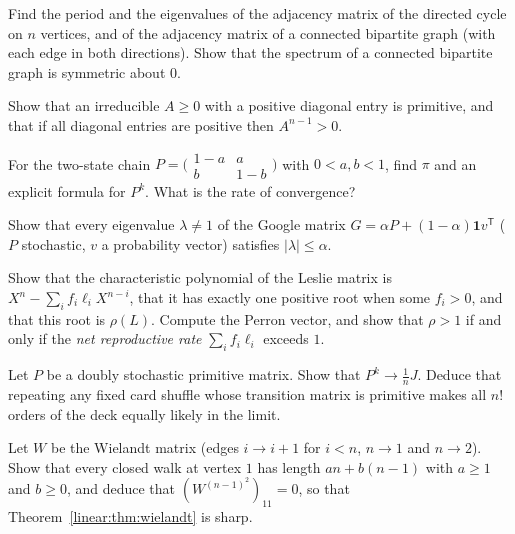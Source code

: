 \begin{exercise}[$\star$]\label{linear:ex:cycleperiod}
Find the period and the eigenvalues of the adjacency matrix of the directed cycle on $n$ vertices, and of the adjacency matrix
of a connected bipartite graph (with each edge in both directions). Show that the spectrum of a connected bipartite graph is
symmetric about $0$.
\end{exercise}

\begin{exercise}[$\star$]\label{linear:ex:diagpos}
Show that an irreducible $A\ge0$ with a positive diagonal entry is primitive, and that if all diagonal entries are positive then
$A^{n-1}>0$.
\end{exercise}

\begin{exercise}[$\star$]\label{linear:ex:twostate}
For the two-state chain $P=\bigl(\begin{smallmatrix}1-a&a\\b&1-b\end{smallmatrix}\bigr)$ with $0<a,b<1$, find $\pi$ and an
explicit formula for $P^k$. What is the rate of convergence?
\end{exercise}

\begin{exercise}[$\star\star$]\label{linear:ex:pagerankrate}
Show that every eigenvalue $\lambda\ne1$ of the Google matrix $G=\alpha P+(1-\alpha)\mathbf 1v^{\mathsf T}$ ($P$ stochastic, $v$ a
probability vector) satisfies $|\lambda|\le\alpha$.
\end{exercise}

\begin{exercise}[$\star\star$]\label{linear:ex:leslie}
Show that the characteristic polynomial of the Leslie matrix is $X^n-\sum_if_i\ell_iX^{n-i}$, that it has exactly one
positive root when some $f_i>0$, and that this root is $\rho(L)$. Compute the Perron vector, and show that $\rho>1$ if and only
if the \emph{net reproductive rate} $\sum_if_i\ell_i$ exceeds $1$.
\end{exercise}

\begin{exercise}[$\star\star$]\label{linear:ex:doublystoch}
Let $P$ be a doubly stochastic primitive matrix. Show that $P^k\to\frac1nJ$. Deduce that repeating any fixed card shuffle
whose transition matrix is primitive makes all $n!$ orders of the deck equally likely in the limit.
\end{exercise}

\begin{exercise}[$\star\star\star$]\label{linear:ex:wielandtsharp}
Let $W$ be the Wielandt matrix (edges $i\to i+1$ for $i<n$, $n\to1$ and $n\to2$). Show that every closed walk at vertex $1$
has length $an+b(n-1)$ with $a\ge1$ and $b\ge0$, and deduce that $(W^{(n-1)^2})_{11}=0$, so that Theorem~\ref{linear:thm:wielandt} is
sharp.
\end{exercise}


